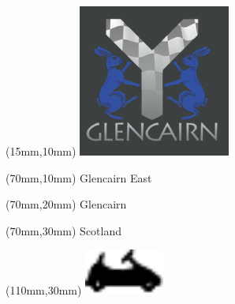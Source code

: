 \null\newpage
\begin{textblock*}{50mm}(15mm,10mm)%
\includegraphics[width=50mm]{LG/GLCN.png}
\end{textblock*}
\begin{textblock*}{130mm}(70mm,10mm)%
{\fontsize{20}{20}\selectfont Glencairn East}\\
\end{textblock*}
\begin{textblock*}{120mm}(70mm,20mm)%
{\fontsize{16}{16}\selectfont Glencairn}\\
\end{textblock*}
\begin{textblock*}{120mm}(70mm,30mm)%
{\fontsize{12}{12}\selectfont Scotland}
\end{textblock*}
\begin{textblock*}{30mm}(110mm,30mm)%
\centering
\includegraphics[height=15mm]{icons/kart.pdf}
\end{textblock*}
